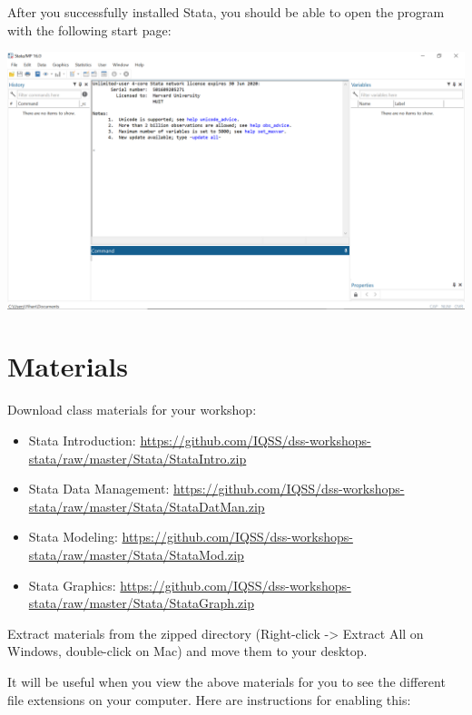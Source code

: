 \documentclass[
]{book}
\providecommand{\tightlist}{%
  \setlength{\itemsep}{0pt}\setlength{\parskip}{0pt}}
\begin{document}
\begin{alert}

After you successfully installed Stata, you should be able to open the program with the following start page:

\end{alert}

\includegraphics{Stata/StataInstall/images/Stata_start_panel.png}

\hypertarget{materials-2}{%
\section{Materials}\label{materials-2}}

Download class materials for your workshop:

\begin{itemize}
\tightlist
\item
  Stata Introduction: \url{https://github.com/IQSS/dss-workshops-stata/raw/master/Stata/StataIntro.zip}
\item
  Stata Data Management: \url{https://github.com/IQSS/dss-workshops-stata/raw/master/Stata/StataDatMan.zip}
\item
  Stata Modeling: \url{https://github.com/IQSS/dss-workshops-stata/raw/master/Stata/StataMod.zip}
\item
  Stata Graphics: \url{https://github.com/IQSS/dss-workshops-stata/raw/master/Stata/StataGraph.zip}
\end{itemize}

Extract materials from the zipped directory (Right-click -\textgreater{} Extract All on Windows, double-click on Mac) and move them to your desktop.

It will be useful when you view the above materials for you to see the different file extensions on your computer. Here are instructions for enabling this:
\end{document}
